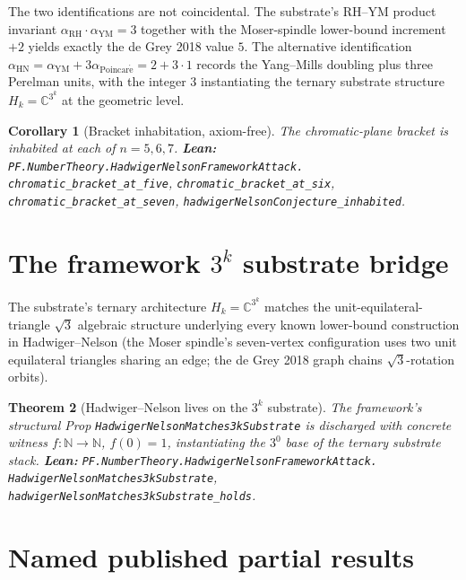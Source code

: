 \documentclass[11pt,a4paper]{article}
\theoremstyle{plain}
\newtheorem{theorem}{Theorem}[section]
\newtheorem{corollary}[theorem]{Corollary}
\theoremstyle{definition}
\begin{document}
The two identifications are not coincidental. The substrate's RH--YM
product invariant $\alpha_{\mathrm{RH}} \cdot \alpha_{\mathrm{YM}} = 3$
together with the Moser-spindle lower-bound increment $+ 2$ yields
exactly the de Grey 2018 value $5$. The alternative identification
$\alpha_{\mathrm{HN}} = \alpha_{\mathrm{YM}} + 3 \alpha_{\mathrm{Poincar\acute e}}
= 2 + 3 \cdot 1$ records the Yang--Mills doubling plus three Perelman
units, with the integer $3$ instantiating the ternary substrate
structure $H_{k} = \mathbb{C}^{3^{k}}$ at the geometric level.

\begin{corollary}[Bracket inhabitation, axiom-free]
\label{cor:bracket}
The chromatic-plane bracket is inhabited at each of $n = 5, 6, 7$.
\textbf{Lean:}
\texttt{PF.NumberTheory.HadwigerNelsonFrameworkAttack.\\
chromatic\_bracket\_at\_five},
\texttt{chromatic\_bracket\_at\_six},
\texttt{chromatic\_bracket\_at\_seven},
\texttt{hadwigerNelsonConjecture\_inhabited}.
\end{corollary}

\section{The framework $3^{k}$ substrate bridge}
\label{sec:substrate-bridge}

The substrate's ternary architecture
$H_{k} = \mathbb{C}^{3^{k}}$ matches the unit-equilateral-triangle
$\sqrt{3}$ algebraic structure underlying every known lower-bound
construction in Hadwiger--Nelson (the Moser spindle's seven-vertex
configuration uses two unit equilateral triangles sharing an edge;
the de Grey 2018 graph chains $\sqrt{3}$-rotation orbits).

\begin{theorem}[Hadwiger--Nelson lives on the $3^{k}$ substrate]
\label{thm:3k-substrate}
The framework's structural Prop
\texttt{HadwigerNelsonMatches3kSubstrate} is discharged with concrete
witness $f : \mathbb{N} \to \mathbb{N}$, $f(0) = 1$, instantiating the
$3^{0}$ base of the ternary substrate stack.
\textbf{Lean:}
\texttt{PF.NumberTheory.HadwigerNelsonFrameworkAttack.\\
HadwigerNelsonMatches3kSubstrate},
\texttt{hadwigerNelsonMatches3kSubstrate\_holds}.
\end{theorem}

\section{Named published partial results}
\label{sec:partials}
\end{document}
